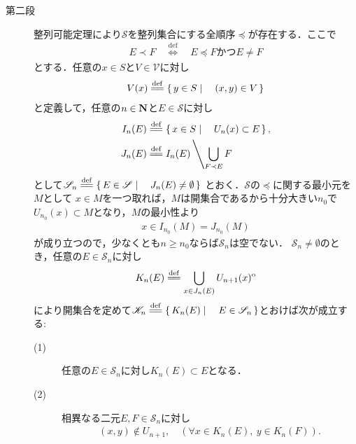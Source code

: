 \begin{prf}
\begin{description}
			\item[第二段]
				整列可能定理により$\mathscr{S}$を整列集合にする全順序$\preceq$が存在する．ここで
				\begin{align}
					E \prec F \quad \overset{\mathrm{def}}{\Longleftrightarrow} \quad
					\mbox{$E \preceq F$かつ$E \neq F$}
				\end{align}
				とする．任意の$x \in S$と$V \in \mathscr{V}$に対し
				\begin{align}
					V(x) \defeq \Set{y \in S}{(x,y) \in V}
				\end{align}
				と定義して，任意の$n \in \mathbf{N}$と$E \in \mathscr{S}$に対し
				\begin{align}
					I_n(E) &\defeq \Set{x \in S}{U_n(x) \subset E}, \\
					J_n(E) &\defeq I_n(E) \left\backslash \bigcup_{F \prec E}F \right.
				\end{align}
				として$\mathscr{S}_n \defeq \Set{E \in \mathscr{S}}{J_n(E) \neq \emptyset}$
				とおく．$\mathscr{S}$の$\preceq$に関する最小元を$M$として
				$x \in M$を一つ取れば，$M$は開集合であるから十分大きい$n_0$で
				$U_{n_0}(x) \subset M$となり，$M$の最小性より
				\begin{align}
					x \in I_{n_0}(M) = J_{n_0}(M)
				\end{align}
				が成り立つので，少なくとも$n \geq n_0$ならば$\mathscr{S}_n$は空でない．
				$\mathscr{S}_n \neq \emptyset$のとき，任意の$E \in \mathscr{S}_n$に対し
				\begin{align}
					K_n(E) \defeq \bigcup_{x \in J_n(E)} U_{n+1}(x)^{\mathrm{o}}
				\end{align}
				により開集合を定めて$\mathscr{K}_n \defeq 
				\Set{K_n(E)}{E \in \mathscr{S}_n}$とおけば次が成立する:
				\begin{description}
					\item[(1)] 任意の$E \in \mathscr{S}_n$に対し$K_n(E) \subset E$となる．
					
					\item[(2)] 相異なる二元$E, F \in \mathscr{S}_n$に対し
						\begin{align}
							(x,y) \notin U_{n+1},\quad
							(\forall x \in K_n(E),\ y \in K_n(F)).
						\end{align}
						

\end{description}
\end{description}
\end{prf}
